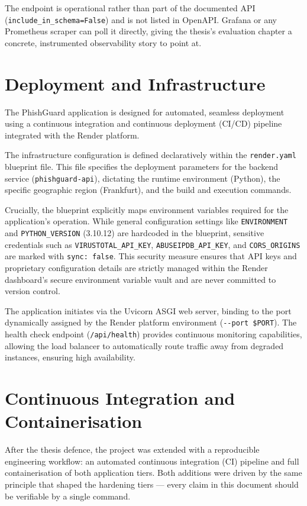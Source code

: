 The endpoint is operational rather than part of the documented API
(\texttt{include\_in\_schema=False}) and is not listed in OpenAPI.
Grafana or any Prometheus scraper can poll it directly, giving the
thesis's evaluation chapter a concrete, instrumented observability
story to point at.

\section{Deployment and
Infrastructure}\label{deployment-and-infrastructure}

The PhishGuard application is designed for automated, seamless
deployment using a continuous integration and continuous deployment
(CI/CD) pipeline integrated with the Render platform.

The infrastructure configuration is defined declaratively within the
\texttt{render.yaml} blueprint file. This file specifies the deployment
parameters for the backend service (\texttt{phishguard-api}), dictating
the runtime environment (Python), the specific geographic region
(Frankfurt), and the build and execution commands.

Crucially, the blueprint explicitly maps environment variables required
for the application's operation. While general configuration settings
like \texttt{ENVIRONMENT} and \texttt{PYTHON\_VERSION} (3.10.12) are
hardcoded in the blueprint, sensitive credentials such as
\texttt{VIRUSTOTAL\_API\_KEY}, \texttt{ABUSEIPDB\_API\_KEY}, and
\texttt{CORS\_ORIGINS} are marked with \texttt{sync:\ false}. This
security measure ensures that API keys and proprietary configuration
details are strictly managed within the Render dashboard's secure
environment variable vault and are never committed to version control.

The application initiates via the Uvicorn ASGI web server, binding to
the port dynamically assigned by the Render platform environment
(\texttt{-\/-port\ \$PORT}). The health check endpoint
(\texttt{/api/health}) provides continuous monitoring capabilities,
allowing the load balancer to automatically route traffic away from
degraded instances, ensuring high availability.

\section{Continuous Integration and Containerisation}\label{ci-cd-and-docker}

After the thesis defence, the project was extended with a reproducible
engineering workflow: an automated continuous integration (CI) pipeline
and full containerisation of both application tiers. Both additions were
driven by the same principle that shaped the hardening tiers --- every
claim in this document should be verifiable by a single command.

